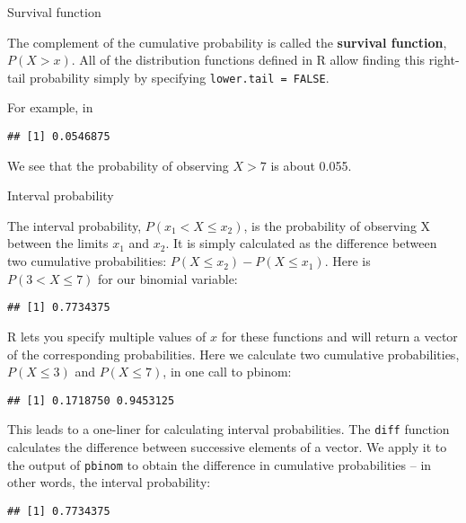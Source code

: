 \documentclass[ignorenonframetext,aspectratio=169]{beamer}
\begin{document}
\begin{frame}[fragile]{Survival function}
\protect\hypertarget{survival-function}{}

The complement of the cumulative probability is called the
\textbf{survival function}, \(P(X > x)\). All of the distribution
functions defined in R allow finding this right-tail probability simply
by specifying \texttt{lower.tail\ =\ FALSE}.

For example, in

\begin{verbatim}
## [1] 0.0546875
\end{verbatim}

We see that the probability of observing \(X > 7\) is about 0.055.

\end{frame}

\begin{frame}[fragile]{Interval probability}
\protect\hypertarget{interval-probability}{}

The interval probability, \(P(x_1 < X \leq x_2 )\), is the probability
of observing X between the limits \(x_1\) and \(x_2\). It is simply
calculated as the difference between two cumulative probabilities:
\(P(X \leq x_2 ) - P(X \leq x_1 )\). Here is \(P(3 < X \leq 7)\) for our
binomial variable:

\begin{verbatim}
## [1] 0.7734375
\end{verbatim}

R lets you specify multiple values of \(x\) for these functions and will
return a vector of the corresponding probabilities. Here we calculate
two cumulative probabilities, \(P(X \leq 3)\) and \(P(X \leq 7)\), in
one call to pbinom:

\begin{verbatim}
## [1] 0.1718750 0.9453125
\end{verbatim}

\end{frame}

\begin{frame}[fragile]{}
\protect\hypertarget{section-3}{}

This leads to a one-liner for calculating interval probabilities. The
\texttt{diff} function calculates the difference between successive
elements of a vector. We apply it to the output of \texttt{pbinom} to
obtain the difference in cumulative probabilities -- in other words, the
interval probability:

\begin{verbatim}
## [1] 0.7734375
\end{verbatim}

\end{frame}
\end{document}
